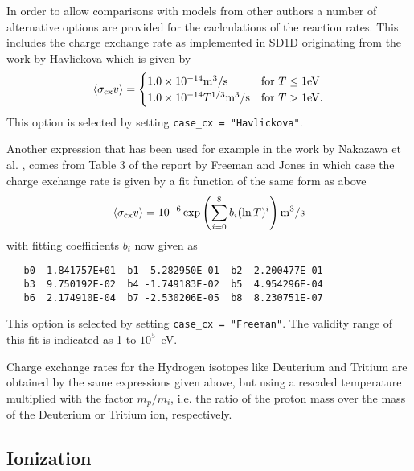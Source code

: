 \documentclass[amsmath,amssymb,a4]{revtex4-2}
\begin{document}
In order to allow comparisons with models from other authors a number of alternative options are provided for the caclculations of the reaction rates. This includes the charge exchange rate as implemented in SD1D originating from the work by Havlickova \cite{havlickova2013} which is given by \cite{SD1D}
\begin{equation}\label{charge_exchange_SD1D}
    \langle\sigma_{\rm cx} v\rangle = \begin{cases} 1.0 \times 10^{-14} {\rm m}^3/{\rm s}             & \mbox{for } T \le 1 {\rm eV} \\
                                        1.0 \times 10^{-14} T^{1/3} {\rm m}^3/{\rm s} & \mbox{for } T >   1 {\rm eV}. \end{cases}
\end{equation}
This option is selected by setting {\tt case\_cx = "Havlickova"}.

Another expression that has been used for example in the work by Nakazawa et al. \cite{nakazawa2000}, comes from Table 3 of the report by Freeman and Jones \cite{freeman1974} in which case the charge exchange rate is given by a fit function of the same form as above
\begin{equation}\label{charge_exchange_FJ}
    \langle\sigma_{\rm cx} v\rangle = 10^{-6} \exp\left( \sum_{i=0}^8 b_i (\ln T)^i \right)  {\rm m}^3/{\rm s}
\end{equation}
with fitting coefficients $b_i$ now given as
\begin{small}\begin{verbatim}
   b0 -1.841757E+01  b1  5.282950E-01  b2 -2.200477E-01
   b3  9.750192E-02  b4 -1.749183E-02  b5  4.954296E-04
   b6  2.174910E-04  b7 -2.530206E-05  b8  8.230751E-07
\end{verbatim}\end{small}
This option is selected by setting {\tt case\_cx = "Freeman"}. The validity range of this fit is indicated as 1 to $10^5$~eV.

Charge exchange rates for the Hydrogen isotopes like Deuterium and Tritium are obtained by the same expressions given above, but using a rescaled temperature multiplied with the factor $m_p/m_i$, i.e. the ratio of the proton mass over the mass of the Deuterium or Tritium ion, respectively.


\subsection{Ionization}
\end{document}
